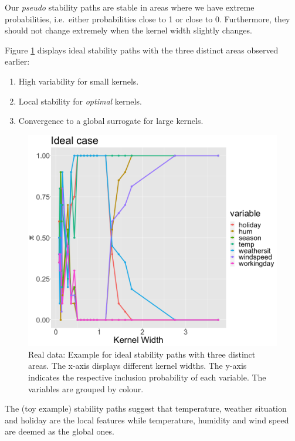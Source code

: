 \documentclass[]{krantz}
\begin{document}
Our \emph{pseudo} stability paths are stable in areas where we have
extreme probabilities, i.e.~either probabilities close to 1 or close to
0. Furthermore, they should not change extremely when the kernel width
slightly changes.

Figure \ref{fig:lime-fig131} displays ideal stability paths with the
three distinct areas observed earlier:

\begin{enumerate}
\def\labelenumi{\arabic{enumi}.}
\item
  High variability for small kernels.
\item
  Local stability for \emph{optimal} kernels.
\item
  Convergence to a global surrogate for large kernels.
\end{enumerate}

\begin{figure}

{\centering \includegraphics[width=0.99\linewidth]{images/04-09-14} 

}

\caption{Real data: Example for ideal stability paths with three distinct areas. The x-axis displays different kernel widths. The y-axis indicates the respective inclusion probability of each variable. The variables are grouped by colour.}\label{fig:lime-fig131}
\end{figure}

The (toy example) stability paths suggest that temperature, weather
situation and holiday are the local features while temperature, humidity
and wind speed are deemed as the global ones.
\end{document}
